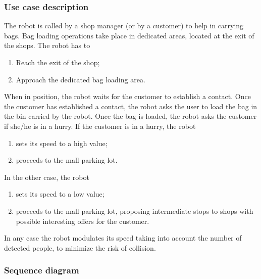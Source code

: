 \subsubsection{Use case description}

The robot is called by a shop manager (or by a customer) to help
in carrying bags. Bag loading operations take place in dedicated areas,
located at the exit of the shops.
The robot has to
\begin{enumerate}
\item Reach the exit of the shop;
\item Approach the dedicated bag loading area.
\end{enumerate}

\noindent When in position, the robot waits for the customer to establish
a contact.
Once the customer has established a contact, the robot asks the user
to load the bag in the bin carried by the robot.
Once the bag is loaded, the robot asks the customer if she/he is in a hurry.
If the customer is in a hurry, the robot
\begin{enumerate}
\item sets its speed to a high value;
\item proceeds to the mall parking lot.
\end{enumerate}

\noindent In the other case, the robot
\begin{enumerate}
\item sets its speed to a low value;
\item proceeds to the mall parking lot, proposing intermediate stops to shops
with possible interesting offers for the customer.
\end{enumerate}

In any case the robot modulates its speed taking into account the number of detected people, to minimize the risk of collision.

\subsubsection{Sequence diagram}

